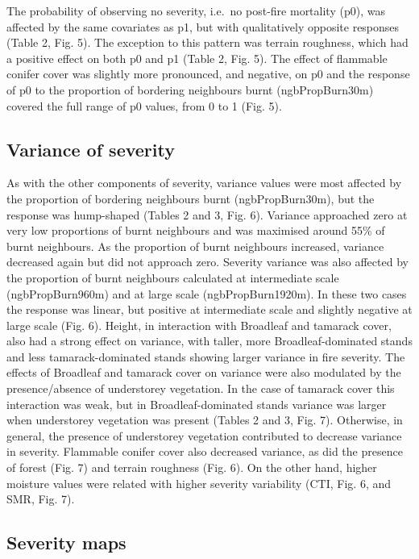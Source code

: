\documentclass[
  numafflabel,
  authoryear,
  preprint]{elsarticle}
\begin{document}
The probability of observing no severity, i.e.~no post-fire mortality
(p0), was affected by the same covariates as p1, but with qualitatively
opposite responses (Table 2, Fig. 5). The exception to this pattern was
terrain roughness, which had a positive effect on both p0 and p1 (Table
2, Fig. 5). The effect of flammable conifer cover was slightly more
pronounced, and negative, on p0 and the response of p0 to the proportion
of bordering neighbours burnt (ngbPropBurn30m) covered the full range of
p0 values, from 0 to 1 (Fig. 5).

\subsection{Variance of severity}\label{variance-of-severity}

As with the other components of severity, variance values were most
affected by the proportion of bordering neighbours burnt
(ngbPropBurn30m), but the response was hump-shaped (Tables 2 and 3, Fig.
6). Variance approached zero at very low proportions of burnt neighbours
and was maximised around 55\% of burnt neighbours. As the proportion of
burnt neighbours increased, variance decreased again but did not
approach zero. Severity variance was also affected by the proportion of
burnt neighbours calculated at intermediate scale (ngbPropBurn960m) and
at large scale (ngbPropBurn1920m). In these two cases the response was
linear, but positive at intermediate scale and slightly negative at
large scale (Fig. 6). Height, in interaction with Broadleaf and tamarack
cover, also had a strong effect on variance, with taller, more
Broadleaf-dominated stands and less tamarack-dominated stands showing
larger variance in fire severity. The effects of Broadleaf and tamarack
cover on variance were also modulated by the presence/absence of
understorey vegetation. In the case of tamarack cover this interaction
was weak, but in Broadleaf-dominated stands variance was larger when
understorey vegetation was present (Tables 2 and 3, Fig. 7). Otherwise,
in general, the presence of understorey vegetation contributed to
decrease variance in severity. Flammable conifer cover also decreased
variance, as did the presence of forest (Fig. 7) and terrain roughness
(Fig. 6). On the other hand, higher moisture values were related with
higher severity variability (CTI, Fig. 6, and SMR, Fig. 7).

\subsection{Severity maps}\label{severity-maps}
\end{document}
